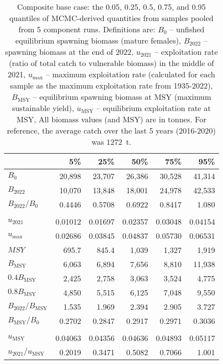 \documentclass[11pt]{book}
\begin{document}
\begin{table}[ht]
\centering
\caption{Composite base case: the 0.05, 0.25, 0.5, 0.75, and 0.95 quantiles of MCMC-derived quantities from \Nbase samples pooled from 5 component runs. Definitions are: $B_0$ -- unfished equilibrium spawning biomass (mature females), $B_{2022}$ -- spawning biomass at the end of 2022, $u_{2021}$ -- exploitation rate (ratio of total catch to vulnerable biomass) in the middle of 2021, $u_\mathrm{max}$ -- maximum exploitation rate (calculated for each sample as the maximum exploitation rate from 1935-2022), $B_\mathrm{MSY}$ -- equilibrium spawning biomass at MSY (maximum sustainable yield), $u_\mathrm{MSY}$ -- equilibrium exploitation rate at MSY, All biomass values (and MSY) are in tonnes. For reference, the average catch over the last 5 years (2016-2020) was 1272~t.} 
\label{tab:ymr.base.rfpt}
\begin{tabular}{lrrrrr}
  \\[-1.0ex] \hline
 & 5\% & 25\% & 50\% & 75\% & 95\% \\ 
  \hline
$B_{0}$ & 20,898 & 23,707 & 26,386 & 30,528 & 41,314 \\ 
  $B_{2022}$ & 10,070 & 13,848 & 18,001 & 24,978 & 42,533 \\ 
  $B_{2022}/B_{0}$ & 0.4446 & 0.5708 & 0.6922 & 0.8417 & 1.080 \\ 
   \hdashline \\[-1.75ex]$u_{2021}$ & 0.01012 & 0.01697 & 0.02357 & 0.03048 & 0.04154 \\ 
  $u_\mathrm{max}$ & 0.02686 & 0.03845 & 0.04837 & 0.05730 & 0.06531 \\ 
   \hline
$MSY$ & 695.7 & 845.4 & 1,039 & 1,327 & 1,919 \\ 
  $B_\mathrm{MSY}$ & 6,063 & 6,894 & 7,656 & 8,810 & 11,938 \\ 
  $0.4B_{\mathrm{MSY}}$ & 2,425 & 2,758 & 3,063 & 3,524 & 4,775 \\ 
  $0.8B_{\mathrm{MSY}}$ & 4,850 & 5,515 & 6,125 & 7,048 & 9,550 \\ 
  $B_{2022}/B_\mathrm{MSY}$ & 1.535 & 1.969 & 2.394 & 2.905 & 3.727 \\ 
  $B_\mathrm{MSY}/B_{0}$ & 0.2702 & 0.2847 & 0.2917 & 0.2971 & 0.3036 \\ 
   \hdashline \\[-1.75ex]$u_\mathrm{MSY}$ & 0.04063 & 0.04356 & 0.04636 & 0.04893 & 0.05117 \\ 
  $u_{2021}/u_\mathrm{MSY}$ & 0.2019 & 0.3471 & 0.5082 & 0.7066 & 1.001 \\ 
   \hline
\end{tabular}
\end{table}
\end{document}
